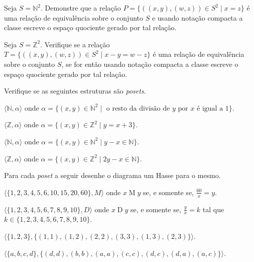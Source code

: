 \begin{problem}\label{prob:EquivalenciaOrdem12}
	Seja $S = \mathbb{N}^2$. Demonstre que a relação $P = \{((x, y), (w, z)) \in S^2 \mid x = z \}$ é uma relação de equivalência sobre o conjunto $S$ e usando notação compacta a classe escreve o espaço quociente gerado por tal relação.
\end{problem}

\begin{problem}\label{prob:EquivalenciaOrdem13}
	Seja $S = \mathbb{Z}^2$. Verifique se a relação $T = \{((x, y), (w, z)) \in S^2 \mid x - y = w - z \}$ é uma relação de equivalência sobre o conjunto $S$, se for então usando notação compacta a classe escreve o espaço quociente gerado por tal relação.
\end{problem}

\begin{problem}\label{prob:EquivalenciaOrdem14}
	Verifique se as seguintes estruturas são \textit{posets}.
\end{problem}

\begin{exerList}
	\item $\langle \mathbb{N}, \alpha \rangle$ onde $\alpha = \{(x, y) \in \mathbb{N}^2 \mid \text{ o resto da divisão de $y$ por $x$ é igual a } 1\}$.
	\item $\langle \mathbb{Z}, \alpha \rangle$ onde $\alpha = \{(x, y) \in \mathbb{Z}^2  \mid y = x + 3\}$.
	\item $\langle \mathbb{N}, \alpha \rangle$ onde $\alpha = \{(x, y) \in \mathbb{N}^2  \mid y - x \in \mathbb{N}\}$.
	\item $\langle \mathbb{Z}, \alpha \rangle$ onde $\alpha = \{(x, y) \in \mathbb{Z}^2  \mid 2y - x \in \mathbb{N}\}$.
\end{exerList}

\begin{problem}\label{prob:EquivalenciaOrdem15}
	Para cada \textit{poset} a seguir desenhe o diagrama um Hasse para o mesmo.
\end{problem}

\begin{exerList}
	\item $\langle \{1, 2, 3, 4, 5, 6, 10, 15, 20, 60\}, M \rangle$ onde $x \mathrel{M} y$ se, e somente se, $\displaystyle\frac{60}{x} = y$.
	\item $\langle \{1, 2, 3, 4, 5, 6, 7, 8, 9, 10\}, D\rangle$ onde $x \mathrel{D} y$ se, e somente se, $\displaystyle\frac{y}{x} = k$ tal que $k \in \{1, 2, 3, 4, 5, 6, 7, 8, 9, 10\}$.
	\item $\langle \{1, 2, 3\}, \{(1, 1), (1, 2), (2, 2), (3, 3), (1, 3), (2, 3)\} \rangle$.
	\item $\langle \{a, b, c, d\}, \{(d, d), (b, b), (a, a), (c, c), (d, c), (d, a), (a, c)\} \rangle$.
\end{exerList}

